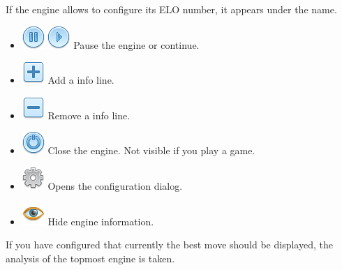 \documentclass[11pt,a4paper]{article}
\begin{document}
If the engine allows to configure its ELO number, it appears under the name.
\begin{itemize}
	\item \includegraphics[scale=0.5]{control_pause_blue.png} \includegraphics[scale=0.5]{control_play_blue.png} Pause the engine or continue.
	\item \includegraphics[scale=0.5]{toggle_expand.png} Add a info line.
	\item \includegraphics[scale=0.5]{toggle.png} Remove a info line.
	\item \includegraphics[scale=0.5]{control_power_blue.png} Close the engine. Not visible if you play a game.
	\item \includegraphics[scale=0.5]{cog.png} Opens the configuration dialog.	
	\item \includegraphics[scale=0.5]{eye.png} Hide engine information.		
\end{itemize}


If you have configured that currently the best move should be displayed, the analysis of the topmost engine is taken.
\end{document}

